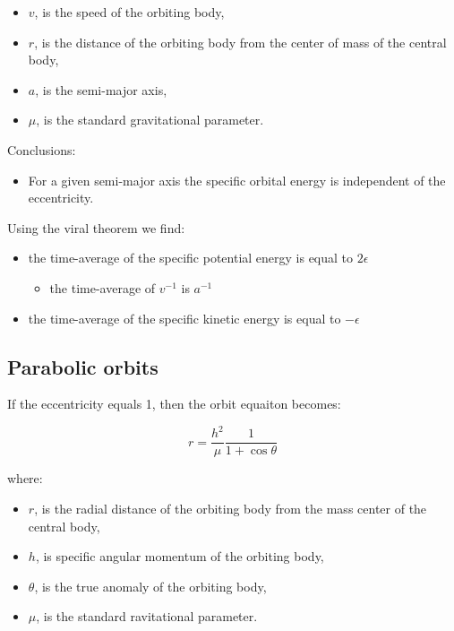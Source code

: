 \documentclass[12pt]{article}
\begin{document}
\begin{itemize}
  \item \(v\), is the speed of the orbiting body,
  \item \(r\), is the distance of the orbiting body from the center of mass of the central body,
  \item \(a\), is the semi-major axis,
  \item \(\mu\), is the standard gravitational parameter.
\end{itemize}

Conclusions:

\begin{itemize}
  \item For a given semi-major axis the specific orbital energy is independent of the eccentricity.
\end{itemize}

Using the viral theorem we find:

\begin{itemize}
  \item the time-average of the specific potential energy is equal to \(2\epsilon\)
    \begin{itemize}
      \item the time-average of \(v^{-1}\) is \(a^{-1}\)
    \end{itemize}
  \item the time-average of the specific kinetic energy is equal to \(-\epsilon\)
\end{itemize}

\subsection{Parabolic orbits}

If the eccentricity equals 1, then the orbit equaiton becomes:

\[r=\frac{h^2}{\mu}\frac{1}{1+\cos\theta}\]

where:

\begin{itemize}
  \item \(r\), is the radial distance of the orbiting body from the mass center of the central body,
  \item \(h\), is specific angular momentum of the orbiting body,
  \item \(\theta\), is the true anomaly of the orbiting body,
  \item \(\mu\), is the standard ravitational parameter.
\end{itemize}
\end{document}
